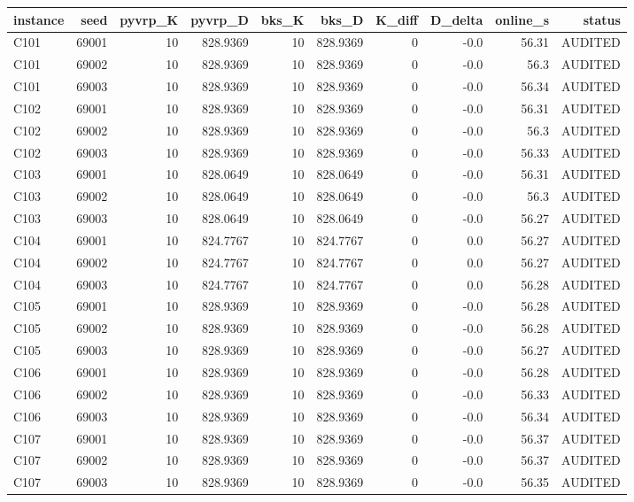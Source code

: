 \begin{tabular}{lrrrrrrrrr}
\toprule
instance & seed & pyvrp\_K & pyvrp\_D & bks\_K & bks\_D & K\_diff & D\_delta & online\_s & status \\
\midrule
C101 & 69001 & 10 & 828.9369 & 10 & 828.9369 & 0 & -0.0 & 56.31 & AUDITED \\
C101 & 69002 & 10 & 828.9369 & 10 & 828.9369 & 0 & -0.0 & 56.3 & AUDITED \\
C101 & 69003 & 10 & 828.9369 & 10 & 828.9369 & 0 & -0.0 & 56.34 & AUDITED \\
C102 & 69001 & 10 & 828.9369 & 10 & 828.9369 & 0 & -0.0 & 56.31 & AUDITED \\
C102 & 69002 & 10 & 828.9369 & 10 & 828.9369 & 0 & -0.0 & 56.3 & AUDITED \\
C102 & 69003 & 10 & 828.9369 & 10 & 828.9369 & 0 & -0.0 & 56.33 & AUDITED \\
C103 & 69001 & 10 & 828.0649 & 10 & 828.0649 & 0 & -0.0 & 56.31 & AUDITED \\
C103 & 69002 & 10 & 828.0649 & 10 & 828.0649 & 0 & -0.0 & 56.3 & AUDITED \\
C103 & 69003 & 10 & 828.0649 & 10 & 828.0649 & 0 & -0.0 & 56.27 & AUDITED \\
C104 & 69001 & 10 & 824.7767 & 10 & 824.7767 & 0 & 0.0 & 56.27 & AUDITED \\
C104 & 69002 & 10 & 824.7767 & 10 & 824.7767 & 0 & 0.0 & 56.27 & AUDITED \\
C104 & 69003 & 10 & 824.7767 & 10 & 824.7767 & 0 & 0.0 & 56.28 & AUDITED \\
C105 & 69001 & 10 & 828.9369 & 10 & 828.9369 & 0 & -0.0 & 56.28 & AUDITED \\
C105 & 69002 & 10 & 828.9369 & 10 & 828.9369 & 0 & -0.0 & 56.28 & AUDITED \\
C105 & 69003 & 10 & 828.9369 & 10 & 828.9369 & 0 & -0.0 & 56.27 & AUDITED \\
C106 & 69001 & 10 & 828.9369 & 10 & 828.9369 & 0 & -0.0 & 56.28 & AUDITED \\
C106 & 69002 & 10 & 828.9369 & 10 & 828.9369 & 0 & -0.0 & 56.33 & AUDITED \\
C106 & 69003 & 10 & 828.9369 & 10 & 828.9369 & 0 & -0.0 & 56.34 & AUDITED \\
C107 & 69001 & 10 & 828.9369 & 10 & 828.9369 & 0 & -0.0 & 56.37 & AUDITED \\
C107 & 69002 & 10 & 828.9369 & 10 & 828.9369 & 0 & -0.0 & 56.37 & AUDITED \\
C107 & 69003 & 10 & 828.9369 & 10 & 828.9369 & 0 & -0.0 & 56.35 & AUDITED \\

\end{tabular}
